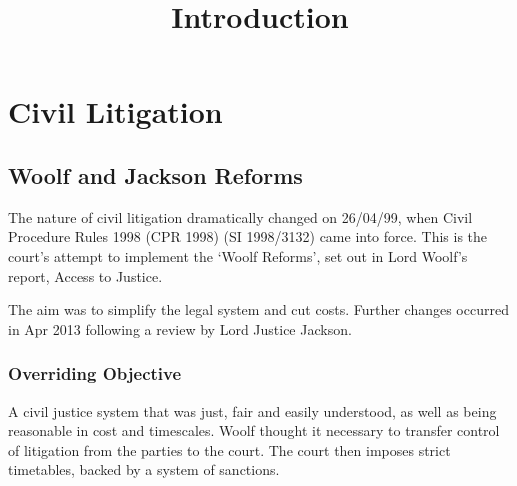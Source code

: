 \documentclass[
]{article}
\title{Introduction}
\author{}
\date{}
\newenvironment{Shaded}{}{}
\begin{document}
\maketitle

{
\setcounter{tocdepth}{3}
\tableofcontents
}
\begin{Shaded}
\begin{Highlighting}[]

\end{Highlighting}
\end{Shaded}

\hypertarget{civil-litigation}{%
\section{Civil Litigation}\label{civil-litigation}}

\hypertarget{woolf-and-jackson-reforms}{%
\subsection{Woolf and Jackson Reforms}\label{woolf-and-jackson-reforms}}

The nature of civil litigation dramatically changed on 26/04/99, when
Civil Procedure Rules 1998 (CPR 1998) (SI 1998/3132) came into force.
This is the court's attempt to implement the `Woolf Reforms', set out in
Lord Woolf's report, Access to Justice.

The aim was to simplify the legal system and cut costs. Further changes
occurred in Apr 2013 following a review by Lord Justice Jackson.

\hypertarget{overriding-objective}{%
\subsubsection{Overriding Objective}\label{overriding-objective}}

A civil justice system that was just, fair and easily understood, as
well as being reasonable in cost and timescales. Woolf thought it
necessary to transfer control of litigation from the parties to the
court. The court then imposes strict timetables, backed by a system of
sanctions.
\end{document}
